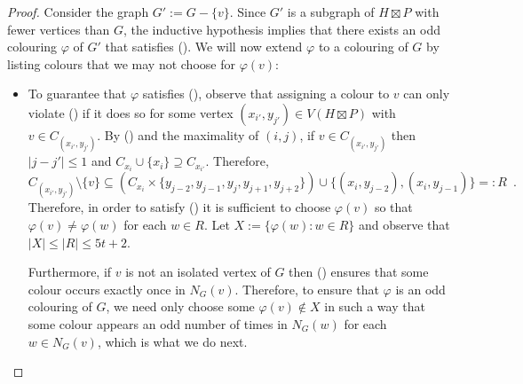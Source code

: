 \documentclass{patmorin}
\begin{document}
\begin{proof}
  Consider the graph $G':= G-\{v\}$. Since $G'$ is a subgraph of $H\boxtimes P$ with fewer vertices than $G$, the inductive hypothesis implies that there exists an odd colouring $\varphi$ of $G'$ that satisfies ().  We will now extend $\varphi$ to a colouring of $G$ by listing colours that we may not choose for $\varphi(v)$:
  \begin{itemize}
    \item To guarantee that $\varphi$ satisfies (), observe that assigning a colour to $v$ can only violate () if it does so for some vertex $(x_{i'},y_{j'})\in V(H\boxtimes P)$ with $v\in C_{(x_{i'},y_{j'})}$.  By () and the maximality of $(i,j)$, if $v\in C_{(x_{i'},y_{j'})}$ then $|j-j'|\le 1$ and $C_{x_{i}}\cup\{x_i\}\supseteq C_{x_{i'}}$.  Therefore,
    \[
        C_{(x_{i'},y_{j'})}\setminus\{v\}\subseteq
          \left(C_{x_i} \times \{y_{j-2},y_{j-1},y_j,y_{j+1},y_{j+2}\}\right)
          \cup \{(x_i,y_{j-2}),(x_i,y_{j-1})\} =: R \enspace .
    \]
    Therefore, in order to satisfy () it is sufficient to choose $\varphi(v)$ so that $\varphi(v)\neq\varphi(w)$ for each $w\in R$.  Let $X:=\{\varphi(w): w\in R\}$ and observe that $|X|\le |R| \le 5t+2$.

    Furthermore, if $v$ is not an isolated vertex of $G$ then () ensures that some colour occurs exactly once in $N_G(v)$. Therefore, to ensure that $\varphi$ is an odd colouring of $G$, we need only choose some $\varphi(v)\not\in X$ in such a way that some colour appears an odd number of times in $N_G(w)$ for each $w\in N_G(v)$, which is what we do next.


\end{itemize}
\end{proof}
\end{document}
